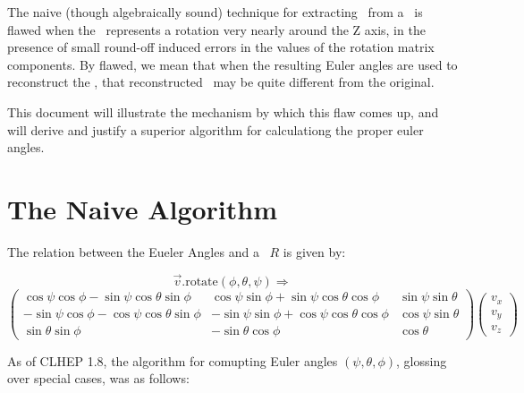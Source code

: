 The naive (though algebraically sound) technique for extracting \Es\ 
from a \Ro\ is flawed when the \Ro\ represents a rotation very nearly 
around the Z axis, in the presence of small round-off induced errors 
in the values of the rotation matrix components.
By flawed, we mean that when the resulting Euler angles are used to 
reconstruct the \Ro, that reconstructed \Ro\ may be quite different 
from the original.

This document will illustrate the mechanism by which this flaw comes up,
and will derive and justify a superior algorithm for calculationg the proper
euler angles.

\tableofcontents

\section{The Naive Algorithm}

The relation between the Eueler Angles and a \Ro\ $R$ is given by:

\[  \vec{v}.\mbox{rotate}(\phi, \theta, \psi) \Longrightarrow  \]
\begin{equation}
\label{eq:eulerrot}
\left(
\begin{array}{ccc}
\cos \psi \cos \phi - \sin \psi \cos \theta \sin \phi &
\cos \psi \sin \phi + \sin \psi \cos \theta \cos \phi &
\sin \psi \sin \theta \\
- \sin \psi \cos \phi - \cos \psi \cos \theta \sin \phi &
- \sin \psi \sin \phi + \cos \psi \cos \theta \cos \phi &
\cos \psi \sin \theta \\
\sin \theta \sin \phi &
- \sin \theta \cos \phi &
\cos \theta
\end{array}
\right)
\left(
\begin{array}{c}
v_x\\
v_y\\
v_z
\end{array}
\right)
\end{equation}


As of CLHEP 1.8, the algorithm for comupting Euler angles 
$(\psi, \theta, \phi)$,
glossing over special cases, was as follows:

